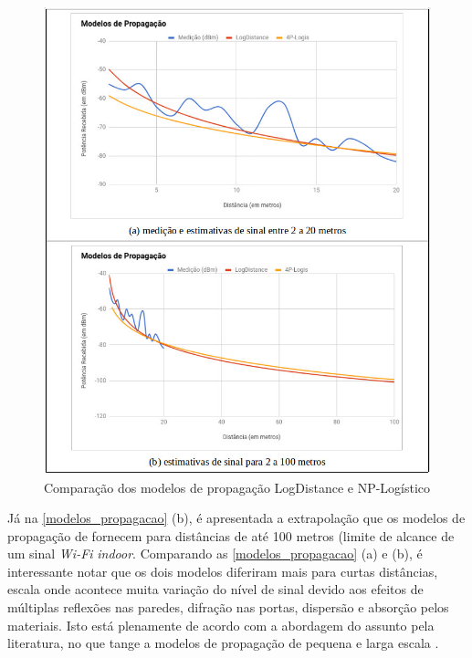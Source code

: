 \documentclass[
	12pt,				%
	twoside,			%
	a4paper,			%
	english,			%
	french,				%
	spanish,			%
	brazil				%
	]{abntex2}
\begin{document}
\begin{figure}[htb]
    \caption{\label{modelos_propagacao} Comparação dos modelos de propagação LogDistance e NP-Logístico}
    \begin{center}
        \includegraphics[scale=0.6]{imagens/modelos-propagacao.jpg}
    \end{center}
\end{figure}

Já na \autoref{modelos_propagacao} (b), é apresentada a extrapolação que
os modelos de propagação de fornecem para distâncias de até 100 metros
(limite de alcance de um sinal \emph{Wi-Fi} \emph{indoor}. Comparando as
\autoref{modelos_propagacao} (a) e (b), é interessante notar que os dois
modelos diferiram mais para curtas distâncias, escala onde acontece
muita variação do nível de sinal devido aos efeitos de múltiplas
reflexões nas paredes, difração nas portas, dispersão e absorção pelos
materiais. Isto está plenamente de acordo com a abordagem do assunto
pela literatura, no que tange a modelos de propagação de pequena e larga
escala \cite{RAPPAPORT}.
\end{document}
